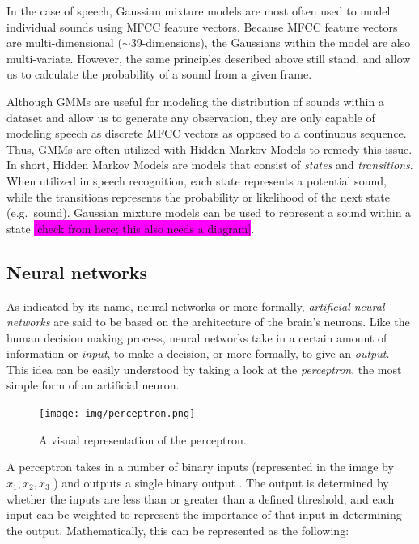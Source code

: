 \documentclass
[
    a4paper,
    twoside,
    12pt,
]
{report}
\begin{document}
In the case of speech, Gaussian mixture models are most often used to
model individual sounds using MFCC feature vectors. Because MFCC feature
vectors are multi-dimensional
(\begin{math} \sim \end{math}39-dimensions), the Gaussians within the
model are also multi-variate. However, the same principles described
above still stand, and allow us to calculate the probability of a sound
from a given frame.

Although GMMs are useful for modeling the distribution of sounds within
a dataset and allow us to generate any observation, they are only
capable of modeling speech as discrete MFCC vectors as opposed to a
continuous sequence. Thus, GMMs are often utilized with Hidden Markov
Models to remedy this issue. In short, Hidden Markov Models are models
that consist of \emph{states} and \emph{transitions}. When utilized in
speech recognition, each state represents a potential sound, while the
transitions represents the probability or likelihood of the next state
(e.g.~sound). Gaussian mixture models can be used to represent a sound
within a state
\colorbox{magenta}{[check from here; this also needs a diagram]}.

\subsection{Neural networks}

As indicated by its name, neural networks or more formally,
\emph{artificial neural networks} are said to be based on the
architecture of the brain's neurons. Like the human decision making
process, neural networks take in a certain amount of information or
\emph{input}, to make a decision, or more formally, to give an
\emph{output}. This idea can be easily understood by taking a look at
the \emph{perceptron}, the most simple form of an artificial neuron.

\begin{figure}[ht!]
\centering
\texttt{[image: img/perceptron.png]}
\caption{A visual representation of the perceptron.}
\label{fig:perceptron}
\end{figure}

A perceptron takes in a number of binary inputs (represented in the
image by \begin{math} x_1, x_2, x_3 \end{math} ) and outputs a single
binary output \parencite{nielsen2015}. The output is determined by
whether the inputs are less than or greater than a defined threshold,
and each input can be weighted to represent the importance of that input
in determining the output. Mathematically, this can be represented as
the following:
\end{document}
